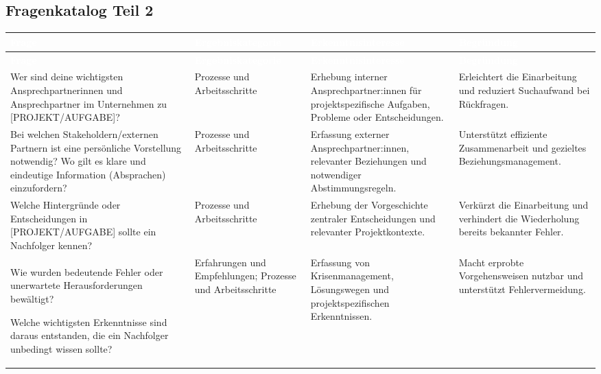 \documentclass[
  10pt,
  ngerman,
  a4paper,
  toc=graduated,
  numbers=noenddot,
  headings=standardclasses,
  nonumberlist
]{scrartcl}
\renewcommand{\arraystretch}{1.0}
\begin{document}
\clearpage
\subsection{Fragenkatalog Teil 2}
\label{anhang_fragenkatalog_2}

\setlength{\tabcolsep}{3.5pt}
\renewcommand{\arraystretch}{1.0}

\begin{longtable}{|L{4.9cm}|L{3.1cm}|L{3.8cm}|L{3.3cm}|}
\hline
{}
\textcolor{white}{\textbf{Frage}} &
\textcolor{white}{\textbf{Ergebniskategorie}} &
\textcolor{white}{\textbf{Erkenntnisinteresse}} &
\textcolor{white}{\textbf{Begründung}} \\
\hline
\endfirsthead

\hline
{}
\textcolor{white}{\textbf{Frage}} &
\textcolor{white}{\textbf{Ergebniskategorie}} &
\textcolor{white}{\textbf{Erkenntnisinteresse}} &
\textcolor{white}{\textbf{Begründung}} \\
\hline
\endhead

Wer sind deine wichtigsten Ansprechpartnerinnen und Ansprechpartner im Unternehmen zu [PROJEKT/AUFGABE]?
& Prozesse und Arbeitsschritte
& Erhebung interner Ansprechpartner:innen für projektspezifische Aufgaben, Probleme oder Entscheidungen.
& Erleichtert die Einarbeitung und reduziert Suchaufwand bei Rückfragen. \\
\hline

Bei welchen Stakeholdern/externen Partnern ist eine persönliche Vorstellung notwendig? Wo gilt es klare und eindeutige Information (Absprachen) einzufordern?
& Prozesse und Arbeitsschritte
& Erfassung externer Ansprechpartner:innen, relevanter Beziehungen und notwendiger Abstimmungsregeln.
& Unterstützt effiziente Zusammenarbeit und gezieltes Beziehungsmanagement. \\
\hline

Welche Hintergründe oder Entscheidungen in [PROJEKT/AUFGABE] sollte ein Nachfolger kennen?
& Prozesse und Arbeitsschritte
& Erhebung der Vorgeschichte zentraler Entscheidungen und relevanter Projektkontexte.
& Verkürzt die Einarbeitung und verhindert die Wiederholung bereits bekannter Fehler. \\
\hline

Wie wurden bedeutende Fehler oder unerwartete Herausforderungen bewältigt? 

Welche wichtigsten Erkenntnisse sind daraus entstanden, die ein Nachfolger unbedingt wissen sollte?
& Erfahrungen und Empfehlungen; Prozesse und Arbeitsschritte
& Erfassung von Krisenmanagement, Lösungswegen und projektspezifischen Erkenntnissen.
& Macht erprobte Vorgehensweisen nutzbar und unterstützt Fehlervermeidung. \\
\hline


\end{longtable}
\end{document}
